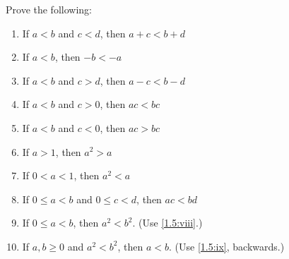 \begin{pr} \label{1.5}
  Prove the following:
  \begin{enumerate}[label=(\roman*)]
    \item \label{1.5:i}
    If $a<b$ and $c<d$, then $a+c<b+d$
    \item If $a<b$, then $-b<-a$
    \item If $a<b$ and $c>d$, then $a-c<b-d$
    \item If $a<b$ and $c>0$, then $ac<bc$
    \item If $a<b$ and $c<0$, then $ac>bc$
    \item If $a>1$, then $a^2>a$
    \item If $0<a<1$, then $a^2<a$
    \item \label{1.5:viii}
    If $0\leq a<b$ and $0\leq c<d$, then $ac<bd$
    \nopagebreak[3]
    \item \label{1.5:ix}
    If $0\leq a<b$, then $a^2<b^2$. (Use \ref{1.5:viii}.)
    \item If $a,b\geq0$ and $a^2<b^2$, then $a<b$.%
    (Use \ref{1.5:ix}, backwards.)
  \end{enumerate}
\end{pr}
\pagebreak
